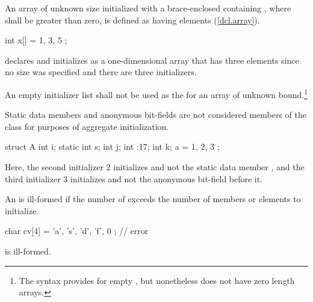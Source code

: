\pnum
An array of unknown size initialized with a
brace-enclosed
containing
,
where
shall be greater than zero, is defined as having
elements (\ref{dcl.array}).
\begin{example}

\begin{codeblock}
int x[] = { 1, 3, 5 };
\end{codeblock}

declares and initializes
as a one-dimensional array that has three elements
since no size was specified and there are three initializers.
\end{example}
An empty initializer list
\tcode{\{\}}
shall not be used as the 
for an array of unknown bound.\footnote{The syntax provides for empty
,
but nonetheless \Cpp does not have zero length arrays.}

\pnum
Static data members and anonymous bit-fields are not considered
members of the class for purposes of aggregate initialization.
\begin{example}

\begin{codeblock}
struct A {
  int i;
  static int s;
  int j;
  int :17;
  int k;
} a = { 1, 2, 3 };
\end{codeblock}

Here, the second initializer 2 initializes
and not the static data member
, and the third initializer 3 initializes 
and not the anonymous bit-field before it.
\end{example}

\pnum
An
is ill-formed if the number of
exceeds the number of members or elements to initialize.
\begin{example}

\begin{codeblock}
char cv[4] = { 'a', 's', 'd', 'f', 0 };     // error
\end{codeblock}

is ill-formed.
\end{example}

